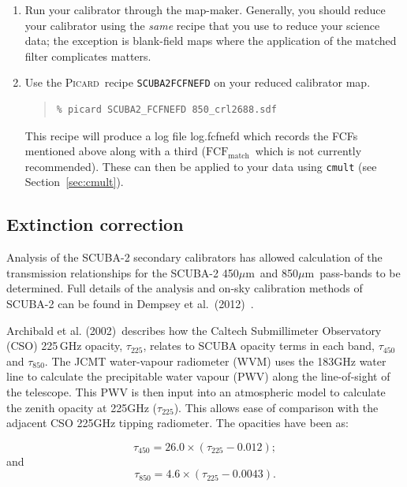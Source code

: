\documentclass[twoside,11pt]{article}
\newcommand{\xref}[3]{#1}
\newcommand{\xlabel}[1]{}
\renewcommand{\_}{\texttt{\symbol{95}}}
\newcommand{\micron}{\mbox{$\mu$m}}
\newenvironment{myquote}{\begin{quote}\begin{small}}{\end{small}\end{quote}}
\newcommand{\fcfm}{$\mathrm{FCF_{match}}$}
\newcommand{\picard}{\xref{\textsc{Picard}}{sun265}{}}
\begin{document}
\begin{enumerate}
\item Run your calibrator through the map-maker. Generally, you should
reduce your calibrator using the \emph{same} recipe that you use to
reduce your science data; the exception is blank-field maps where the
application of the matched filter complicates matters.

\item Use the \picard\ recipe \texttt{SCUBA2\_FCFNEFD} on your reduced calibrator map.
\begin{myquote}
\begin{verbatim}
% picard SCUBA2_FCFNEFD 850_crl2688.sdf
\end{verbatim}
\end{myquote}
This recipe will produce a log file log.fcfnefd which records the FCFs
mentioned above along with a third (\fcfm\ which is not currently
recommended). These can then be applied to your data using
\texttt{cmult} (see Section~\ref{sec:cmult}).
\end{enumerate}

\subsection{\xlabel{extinction}Extinction correction}

Analysis of the SCUBA-2 secondary calibrators has allowed calculation
of the transmission relationships for the SCUBA-2 450\micron\ and
850\micron\ pass-bands to be determined. Full details of the analysis
and on-sky calibration methods of SCUBA-2 can be found in Dempsey et
al.\ (2012)~\cite{dempsey12}\cite{dempsey-spie}.

Archibald et al. (2002)\,\cite{archibald} describes how the Caltech
Submillimeter Observatory (CSO) 225\,GHz opacity, $\tau_{225}$,
relates to SCUBA opacity terms in each band, $\tau_{450}$ and
$\tau_{850}$. The JCMT water-vapour radiometer (WVM) uses the 183GHz
water line to calculate the precipitable water vapour (PWV) along the
line-of-sight of the telescope. This PWV is then input into an
atmospheric model to calculate the zenith opacity at 225GHz
($\tau_{225}$). This allows ease of comparison with the adjacent CSO
225GHz tipping radiometer. The opacities have been as:

\begin{equation}
\tau_{450} = 26.0 \times (\tau_{225} - 0.012);
\end{equation}
and
\begin{equation}
\tau_{850} = 4.6 \times (\tau_{225} - 0.0043).
\end{equation}
\end{document}
